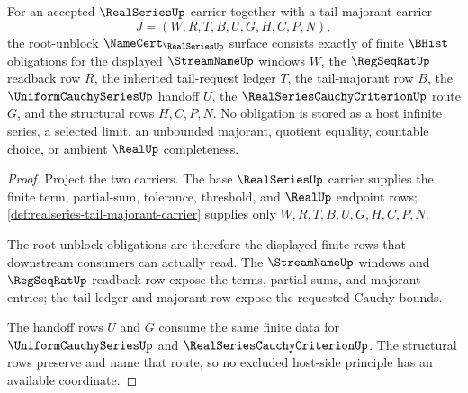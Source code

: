 \begin{theorem}
\label{thm:realseries-namecert-obligation-surface}
For an accepted $\RealSeriesUp$ carrier together with a tail-majorant carrier
$$
J=(W,R,T,B,U,G,H,C,P,N),
$$
the root-unblock $\NameCert_{\RealSeriesUp}$ surface consists exactly of finite $\BHist$ obligations for the displayed $\StreamNameUp$ windows $W$, the $\RegSeqRatUp$ readback row $R$, the inherited tail-request ledger $T$, the tail-majorant row $B$, the $\UniformCauchySeriesUp$ handoff $U$, the $\RealSeriesCauchyCriterionUp$ route $G$, and the structural rows $H,C,P,N$. No obligation is stored as a host infinite series, a selected limit, an unbounded majorant, quotient equality, countable choice, or ambient $\RealUp$ completeness.
\end{theorem}
\begin{proof}
Project the two carriers. The base $\RealSeriesUp$ carrier supplies the finite term, partial-sum, tolerance, threshold, and $\RealUp$ endpoint rows; \autoref{def:realseries-tail-majorant-carrier} supplies only $W,R,T,B,U,G,H,C,P,N$.

The root-unblock obligations are therefore the displayed finite rows that downstream consumers can actually read. The $\StreamNameUp$ windows and $\RegSeqRatUp$ readback row expose the terms, partial sums, and majorant entries; the tail ledger and majorant row expose the requested Cauchy bounds.

The handoff rows $U$ and $G$ consume the same finite data for $\UniformCauchySeriesUp$ and $\RealSeriesCauchyCriterionUp$. The structural rows preserve and name that route, so no excluded host-side principle has an available coordinate.
\end{proof}

